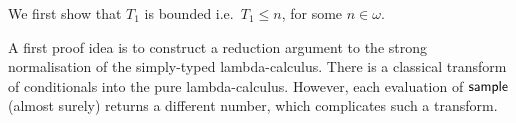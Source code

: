 
\newcommand\transform[1]{{\ulcorner{#1}\urcorner}}

\iffalse
As before, fix a $M \in \Lambda^0$.
Recall the random variables on $(S, \calF, \mu)$:
\begin{align*}
T_0(s) & := 0 \\
T_{n+1}(s) & := \min \{ k \mid k>T_n(s), M_k(s) \textrm{ a value or of form } E[\tY \lambda x. N] \}
\end{align*}
\fi

\TnBounded*

We first show that $T_1$ is bounded i.e.~$T_1 \leq n$, for some $n \in \omega$.

A first proof idea is to construct a reduction argument to the strong normalisation of the simply-typed lambda-calculus.
 There is a classical transform of conditionals into the pure lambda-calculus.
However, each evaluation of $\mathsf{sample}$ (almost surely) returns a different number, which complicates such a transform.

